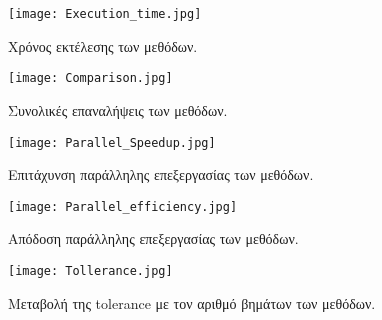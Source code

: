 \documentclass[11pt]{scrartcl} %
\begin{document}
\begin{figure}[H] 

	\centering
	\texttt{[image: Execution\_time.jpg]}	
	\caption{Χρόνος εκτέλεσης των μεθόδων.}
	\label{fig:f10}
\end{figure}



\begin{figure}[H] 

	\centering
	\texttt{[image: Comparison.jpg]}	
	\caption{Συνολικές επαναλήψεις των μεθόδων.}
	\label{fig:f11}
\end{figure}

\begin{figure}[H] 

	\centering
	\texttt{[image: Parallel\_Speedup.jpg]}	
	\caption{Επιτάχυνση παράλληλης επεξεργασίας των μεθόδων.}
	\label{fig:f12}
\end{figure}


\begin{figure}[H] 

	\centering
	\texttt{[image: Parallel\_efficiency.jpg]}	
	\caption{Απόδοση παράλληλης επεξεργασίας των μεθόδων.}
	\label{fig:f13}
\end{figure}

\begin{figure}[H] 

	\centering
	\texttt{[image: Tollerance.jpg]}	
	\caption{Μεταβολή της tolerance με τον αριθμό βημάτων των μεθόδων.}
	\label{fig:f14}
\end{figure}
\end{document}
